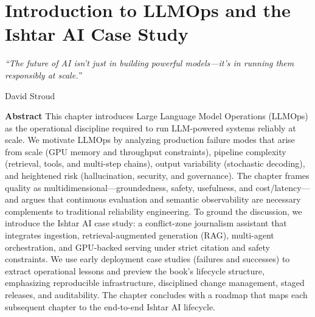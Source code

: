 \chapter{Introduction to LLMOps and the Ishtar AI Case Study}
\label{ch:intro}
\newrefsegment


\epigraph{\emph{``The future of AI isn't just in building powerful models---it's in running them responsibly at scale.''}}{David Stroud}

\textbf{Abstract} This chapter introduces Large Language Model Operations (LLMOps) as the operational discipline required to run LLM-powered systems reliably at scale. We motivate LLMOps by analyzing production failure modes that arise from scale (GPU memory and throughput constraints), pipeline complexity (retrieval, tools, and multi-step chains), output variability (stochastic decoding), and heightened risk (hallucination, security, and governance). The chapter frames quality as multidimensional—groundedness, safety, usefulness, and cost/latency—and argues that continuous evaluation and semantic observability are necessary complements to traditional reliability engineering. To ground the discussion, we introduce the Ishtar AI case study: a conflict-zone journalism assistant that integrates ingestion, retrieval-augmented generation (RAG), multi-agent orchestration, and GPU-backed serving under strict citation and safety constraints. We use early deployment case studies (failures and successes) to extract operational lessons and preview the book's lifecycle structure, emphasizing reproducible infrastructure, disciplined change management, staged releases, and auditability. The chapter concludes with a roadmap that maps each subsequent chapter to the end-to-end Ishtar AI lifecycle.


